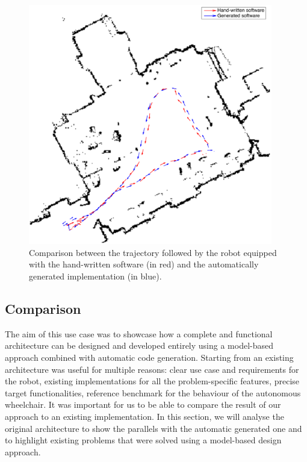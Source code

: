 \begin{figure}[t]
\centering
\includegraphics[width=0.95\textwidth]{gfx/pmk/path-followed}
\caption[Trajectory comparison.]{Comparison between the trajectory followed by the robot equipped with the hand-written software (in red) and the automatically generated implementation (in blue).}
\label{fig:path}
\end{figure}

\subsection{Comparison}
The aim of this use case was to showcase how a complete and functional architecture can be designed and developed entirely using a model-based approach combined with automatic code generation. Starting from an existing architecture was useful for multiple reasons: clear use case and requirements for the robot, existing implementations for all the problem-specific features, precise target functionalities, reference benchmark for the behaviour of the autonomous wheelchair. It was important for us to be able to compare the result of our approach to an existing implementation. In this section, we will analyse the original architecture to show the parallels with the automatic generated one and to highlight existing problems that were solved using a model-based design approach.

